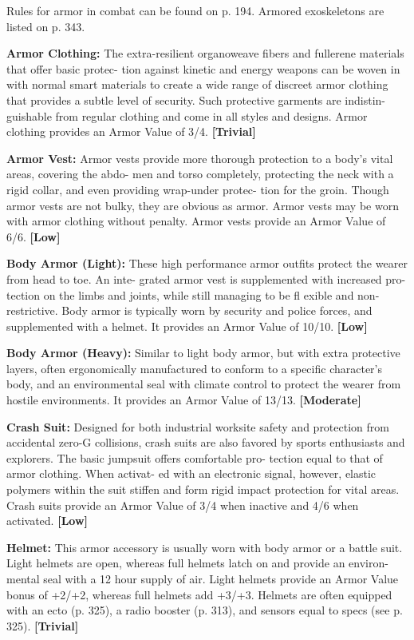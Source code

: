 Rules for armor in combat can be found on p. 194. 
Armored exoskeletons are listed on p. 343.

\textbf{Armor Clothing:} The extra-resilient organoweave 
fibers and fullerene materials that offer basic protec-
tion against kinetic and energy weapons can be woven 
in with normal smart materials to create a wide range 
of discreet armor clothing that provides a subtle level 
of security. Such protective garments are indistin-
guishable from regular clothing and come in all styles 
and designs. Armor clothing provides an Armor Value 
of 3/4. \textbf{[Trivial]}

\textbf{Armor Vest:} Armor vests provide more thorough 
protection to a body's vital areas, covering the abdo-
men and torso completely, protecting the neck with a 
rigid collar, and even providing wrap-under protec-
tion for the groin. Though armor vests are not bulky, 
they are obvious as armor. Armor vests may be worn 
with armor clothing without penalty. Armor vests 
provide an Armor Value of 6/6. \textbf{[Low]}

\textbf{Body Armor (Light):} These high performance armor 
outfits protect the wearer from head to toe. An inte-
grated armor vest is supplemented with increased pro-
tection on the limbs and joints, while still managing to 
be fl exible and non-restrictive. Body armor is typically 
worn by security and police forces, and supplemented 
with a helmet. It provides an Armor Value of 10/10. 
\textbf{[Low]}

\textbf{Body Armor (Heavy):} Similar to light body armor, 
but with extra protective layers, often ergonomically 
manufactured to conform to a specific  character's 
body, and an environmental seal with climate control 
to protect the wearer from hostile environments. It 
provides an Armor Value of 13/13. \textbf{[Moderate]}

\textbf{Crash Suit:} Designed for both industrial worksite 
safety and protection from accidental zero-G collisions, 
crash suits are also favored by sports enthusiasts and 
explorers. The basic jumpsuit offers comfortable pro-
tection equal to that of armor clothing. When activat-
ed with an electronic signal, however, elastic polymers 
within the suit stiffen and form rigid impact protection 
for vital areas. Crash suits provide an Armor Value of 
3/4 when inactive and 4/6 when activated. \textbf{[Low]}

\textbf{Helmet:} This armor accessory is usually worn with 
body armor or a battle suit. Light helmets are open, 
whereas full helmets latch on and provide an environ-
mental seal with a 12 hour supply of air. Light helmets 
provide an Armor Value bonus of +2/+2, whereas full 
helmets add +3/+3. Helmets are often equipped with 
an ecto (p. 325), a radio booster (p. 313), and sensors 
equal to specs (see p. 325). \textbf{[Trivial]}

